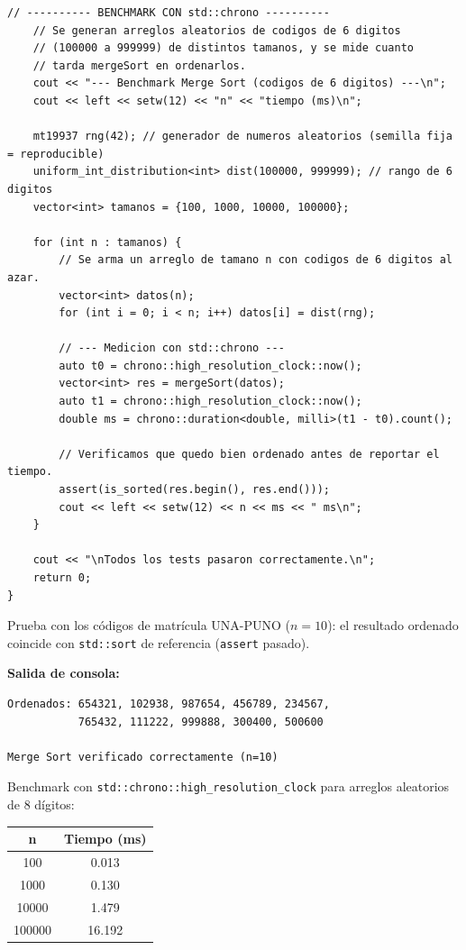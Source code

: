 \documentclass[12pt,a4paper]{article}
\begin{document}
\begin{lstlisting}[style=cpp]
    // ---------- BENCHMARK CON std::chrono ----------
    // Se generan arreglos aleatorios de codigos de 6 digitos
    // (100000 a 999999) de distintos tamanos, y se mide cuanto
    // tarda mergeSort en ordenarlos.
    cout << "--- Benchmark Merge Sort (codigos de 6 digitos) ---\n";
    cout << left << setw(12) << "n" << "tiempo (ms)\n";

    mt19937 rng(42); // generador de numeros aleatorios (semilla fija = reproducible)
    uniform_int_distribution<int> dist(100000, 999999); // rango de 6 digitos
    vector<int> tamanos = {100, 1000, 10000, 100000};

    for (int n : tamanos) {
        // Se arma un arreglo de tamano n con codigos de 6 digitos al azar.
        vector<int> datos(n);
        for (int i = 0; i < n; i++) datos[i] = dist(rng);

        // --- Medicion con std::chrono ---
        auto t0 = chrono::high_resolution_clock::now();
        vector<int> res = mergeSort(datos);
        auto t1 = chrono::high_resolution_clock::now();
        double ms = chrono::duration<double, milli>(t1 - t0).count();

        // Verificamos que quedo bien ordenado antes de reportar el tiempo.
        assert(is_sorted(res.begin(), res.end()));
        cout << left << setw(12) << n << ms << " ms\n";
    }

    cout << "\nTodos los tests pasaron correctamente.\n";
    return 0;
}
\end{lstlisting}

Prueba con los códigos de matrícula UNA-PUNO ($n=10$): el resultado ordenado coincide
con \texttt{std::sort} de referencia (\texttt{assert} pasado).

\textbf{Salida de consola:}

\begin{lstlisting}[style=consola]
Ordenados: 654321, 102938, 987654, 456789, 234567,
           765432, 111222, 999888, 300400, 500600

Merge Sort verificado correctamente (n=10)
\end{lstlisting}

Benchmark con \texttt{std::chrono::high\_resolution\_clock} para arreglos aleatorios de
8 dígitos:

\begin{center}
\begin{tabular}{|c|c|}
\hline
\textbf{n} & \textbf{Tiempo (ms)} \\
\hline
100 & 0.013 \\
\hline
1000 & 0.130 \\
\hline
10000 & 1.479 \\
\hline
100000 & 16.192 \\
\hline
\end{tabular}
\end{center}
\end{document}
